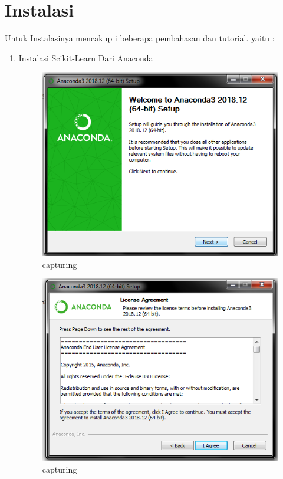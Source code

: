 \section{Instalasi}
Untuk Instalasinya mencakup i beberapa pembahasan dan tutorial. yaitu :
\begin{enumerate}
\item Instalasi Scikit-Learn Dari Anaconda
\begin{itemize}

\begin{figure}[ht]
\centering
\includegraphics[scale=0.5]{figures/1.png}
\caption{capturing}
\label{proses instalasi}
\end{figure}

\begin{figure}[ht]
\centering
\includegraphics[scale=0.5]{figures/2.png}
\caption{capturing}
\label{proses instalasi}
\end{figure}


\end{itemize}
\end{enumerate}
